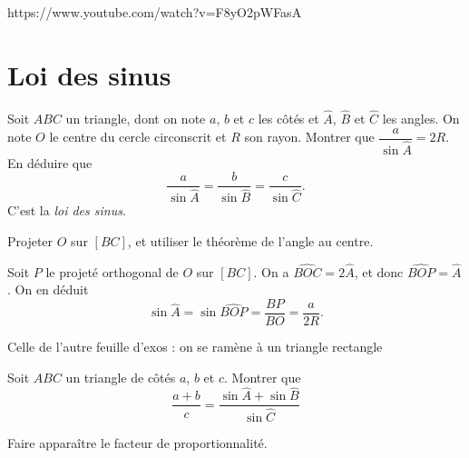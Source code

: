 \begin{exo}https://www.youtube.com/watch?v=F8yO2pWFasA
\begin{hint}
\end{hint}
\begin{sol}
\end{sol}
\end{exo}


\section{Loi des sinus}

\begin{exo}
Soit $ABC$ un triangle, dont on note $a$, $b$ et $c$ les côtés et $\widehat A$, $\widehat B$ et $\widehat C$ les angles.
On note $O$ le centre du cercle  circonscrit et $R$ son rayon.
Montrer que $\dfrac{a}{\sin \widehat A} = 2R$.
En déduire que
\[ \frac{a}{\sin \widehat A} = \frac{b}{\sin \widehat B}  = \frac{c}{\sin \widehat C}.\]
C'est la \emph{loi des sinus}.
\begin{hint}
Projeter $O$ sur $[BC]$, et utiliser le théorème de l'angle au centre.
\end{hint}
\begin{sol}
Soit $P$ le projeté orthogonal de $O$ sur $[BC]$.
On a $\widehat{BOC} = 2\widehat{A}$, et donc $\widehat{BOP}=\widehat A$.
On en déduit 
\[ \sin \widehat A = \sin \widehat{BOP}
= \frac{BP}{BO} = \frac{a}{2R}.\]
\end{sol}
\end{exo}


\begin{exo}
Celle de l'autre feuille d'exos : on se ramène à un triangle rectangle
\begin{hint}
\end{hint}
\begin{sol}
\end{sol}
\end{exo}

\begin{exo}
\begin{hint}
\end{hint}
\begin{sol}
\end{sol}
\end{exo}

\begin{exo}
Soit $ABC$ un triangle de côtés $a$, $b$ et $c$. Montrer que
\[ \frac{a+b}{c}=\frac{\sin \widehat A+\sin \widehat B}{\sin \widehat C}\]
\begin{hint}
Faire apparaître le facteur de proportionnalité.
\end{hint}
\begin{sol}
\end{sol}
\end{exo}


